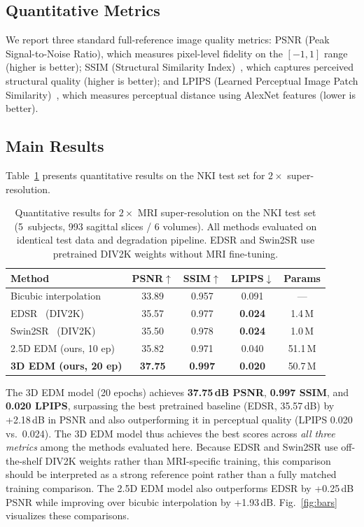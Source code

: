 \documentclass[10pt,journal]{IEEEtran}
\begin{document}
\subsection{Quantitative Metrics}

We report three standard full-reference image quality metrics:
PSNR (Peak Signal-to-Noise Ratio), which measures pixel-level
fidelity on the $[-1, 1]$ range (higher is better);
SSIM (Structural Similarity Index)~\cite{b17}, which captures
perceived structural quality (higher is better); and
LPIPS (Learned Perceptual Image Patch Similarity)~\cite{b22},
which measures perceptual distance using AlexNet features (lower
is better).

\subsection{Main Results}

Table~\ref{tab:results} presents quantitative results on the NKI test
set for $2\times$ super-resolution.

\begin{table}[!t]
\centering
\caption{Quantitative results for $2\times$ MRI super-resolution on
the NKI test set (5~subjects, 993 sagittal slices / 6 volumes).
All methods evaluated on identical test data and degradation pipeline.
EDSR and Swin2SR use pretrained DIV2K weights without MRI fine-tuning.}
\label{tab:results}
\begin{tabular}{@{}lcccc@{}}
\toprule
\textbf{Method} & \textbf{PSNR$\uparrow$} & \textbf{SSIM$\uparrow$} & \textbf{LPIPS$\downarrow$} & \textbf{Params} \\
\midrule
Bicubic interpolation         & 33.89 & 0.957 & 0.091 & ---    \\
EDSR~\cite{b10} (DIV2K)      & 35.57 & 0.977 & \textbf{0.024} & 1.4\,M \\
Swin2SR~\cite{b23} (DIV2K)   & 35.50 & 0.978 & \textbf{0.024} & 1.0\,M \\
2.5D EDM (ours, 10 ep)       & 35.82 & 0.971 & 0.040 & 51.1\,M \\
\textbf{3D EDM (ours, 20 ep)} & \textbf{37.75} & \textbf{0.997} & \textbf{0.020} & 50.7\,M \\
\bottomrule
\end{tabular}
\end{table}

The 3D EDM model (20 epochs) achieves \textbf{37.75\,dB PSNR},
\textbf{0.997 SSIM}, and \textbf{0.020 LPIPS}, surpassing the best
pretrained baseline (EDSR, 35.57\,dB) by +2.18\,dB in PSNR and also
outperforming it in perceptual quality (LPIPS 0.020 vs.\ 0.024).
The 3D EDM model thus achieves the best scores across \emph{all three
metrics} among the methods evaluated here.  Because EDSR and Swin2SR
use off-the-shelf DIV2K weights rather than MRI-specific training, this
comparison should be interpreted as a strong reference point rather than
a fully matched training comparison.  The 2.5D EDM model also outperforms
EDSR by +0.25\,dB PSNR while improving over bicubic interpolation by
+1.93\,dB.
Fig.~\ref{fig:bars} visualizes these comparisons.
\end{document}
